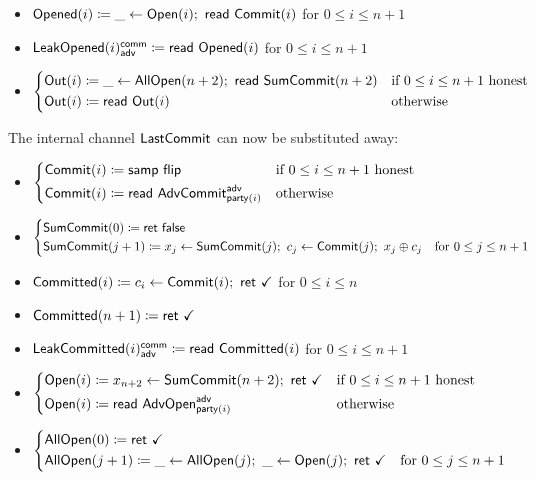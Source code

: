 \begin{itemize}
\item {\color{red} $\mathsf{Opened}(i) \coloneqq \_ \leftarrow \mathsf{Open}(i); \ \mathsf{read} \ \mathsf{Commit}(i)$ for $0 \leq i \leq n+1$}
\item {\color{red} $\mathsf{LeakOpened}(i)^{\mathsf{comm}}_{\mathsf{adv}} \coloneqq \mathsf{read} \ \mathsf{Opened}(i)$ for $0 \leq i \leq n+1$}
\item $\begin{cases*} \Out(i) \coloneqq \_ \leftarrow \AllOpen(n+2); \ \read{\SumCommit(n+2)} & \text{if $0 \leq i \leq n+1$ honest} \\ \Out(i) \coloneqq \read{\Out(i)} & \text{otherwise} \end{cases*}$
\end{itemize}

\noindent The internal channel $\mathsf{LastCommit}$ can now be substituted away:
\begin{itemize}
\item {\color{blue} $\begin{cases*} \Commit(i) \coloneqq \samp{\flip} & \text{if $0 \leq i \leq n+1$ honest} \\ \Commit(i) \coloneqq \read{\AdvCommit^\adv_{\party(i)}} & \text{otherwise} \end{cases*}$}
\item {\color{blue} $\begin{cases*} \SumCommit(0) \coloneqq \ret{\false} & \\ \SumCommit(j+1) \coloneqq x_j \leftarrow \SumCommit(j); \ c_j \leftarrow \Commit(j); \ x_j \oplus c_j & \text{for $0 \leq j \leq n+1$} \end{cases*}$}
\item {\color{magenta} $\mathsf{Committed}(i) \coloneqq c_i \leftarrow \mathsf{Commit}(i); \ \mathsf{ret} \ \checkmark$ for $0 \leq i \leq n$}
\item {\color{magenta} $\mathsf{Committed}(n+1) \coloneqq \mathsf{ret} \ \checkmark$}
\item {\color{magenta} $\mathsf{LeakCommitted}(i)^{\mathsf{comm}}_{\mathsf{adv}} \coloneqq \mathsf{read} \ \mathsf{Committed}(i)$ for $0 \leq i \leq n+1$}
\item {\color{teal} $\begin{cases*} \Open(i) \coloneqq x_{n+2} \leftarrow \SumCommit(n+2); \ \ret{\checkmark} & \text{if $0 \leq i \leq n+1$ honest} \\ \Open(i) \coloneqq \read{\AdvOpen^\adv_{\party(i)}} & \text{otherwise} \end{cases*}$}
\item {\color{teal} $\begin{cases*} \AllOpen(0) \coloneqq \ret{\checkmark} & \\ \AllOpen(j+1) \coloneqq \_ \leftarrow \AllOpen(j); \ \_ \leftarrow \Open(j); \ \ret{\checkmark} & \text{for $0 \leq j \leq n+1$} \end{cases*}$}

\end{itemize}
